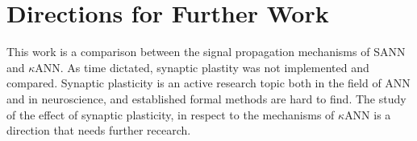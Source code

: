 % 
% 








\section{Directions for Further Work}
This work is a comparison between the signal propagation mechanisms of SANN and $\kappa$ANN.
As time dictated, synaptic plastity was not implemented and compared.
Synaptic plasticity is an active research topic both in the field of ANN and in neuroscience, and established formal methods are hard to find.
The study of the effect of synaptic plasticity, in respect to the mechanisms of $\kappa$ANN is a direction that needs further recearch.

